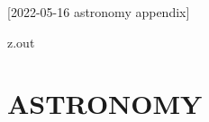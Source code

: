[2022-05-16 astronomy appendix]

\begin{VerbatimOut}{z.out}
\chapter{ASTRONOMY}


\end{VerbatimOut}

\MyIO
